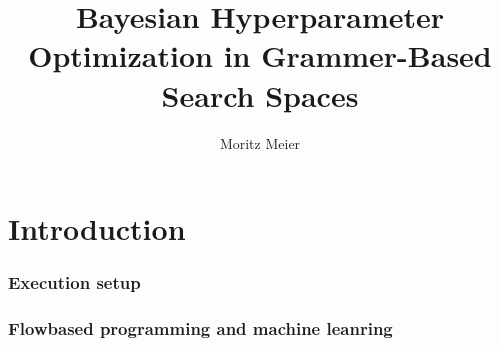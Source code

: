 \documentclass[english]{article}
\begin{document}
  

\title{Bayesian Hyperparameter Optimization in Grammer-Based Search Spaces}
\author{Moritz Meier}

\section{Introduction}


\subsubsection{Execution setup}

\subsubsection{Flowbased programming and machine leanring}


\section{}
\end{document}
